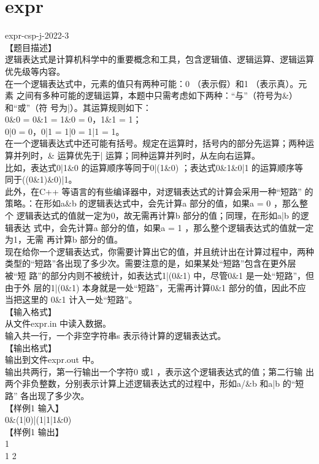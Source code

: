 \documentclass[12pt,twiside,a4paper]{ctexbook}
\numberwithin{chapter}{part}
\begin{document}
\section{expr}
expr-csp-j-2022-3\\
【题目描述】\\
逻辑表达式是计算机科学中的重要概念和工具，包含逻辑值、逻辑运算、逻辑运算
优先级等内容。\\
在一个逻辑表达式中，元素的值只有两种可能：0 （表示假）和1 （表示真）。元素
之间有多种可能的逻辑运算，本题中只需考虑如下两种：“与”（符号为\&）和“或”（符
号为|）。其运算规则如下：\\
0\&0 = 0\&1 = 1\&0 = 0，1\&1 = 1；\\
0|0 = 0，0|1 = 1|0 = 1|1 = 1。\\
在一个逻辑表达式中还可能有括号。规定在运算时，括号内的部分先运算；两种运
算并列时，\& 运算优先于| 运算；同种运算并列时，从左向右运算。\\
比如，表达式0|1\&0 的运算顺序等同于0|(1\&0) ；表达式0\&1\&0|1 的运算顺序等
同于((0\&1)\&0)|1。\\
此外，在C++ 等语言的有些编译器中，对逻辑表达式的计算会采用一种“短路”
的策略。：在形如a\&b 的逻辑表达式中，会先计算a 部分的值，如果a = 0 ，那么整个
逻辑表达式的值就一定为0，故无需再计算b 部分的值；同理，在形如a|b 的逻辑表达
式中，会先计算a 部分的值，如果a = 1 ，那么整个逻辑表达式的值就一定为1，无需
再计算b 部分的值。\\
现在给你一个逻辑表达式，你需要计算出它的值，并且统计出在计算过程中，两种
类型的“短路”各出现了多少次。需要注意的是，如果某处“短路”包含在更外层被“短
路”的部分内则不被统计，如表达式1|(0\&1) 中，尽管0\&1 是一处“短路”，但由于外
层的1|(0\&1) 本身就是一处“短路”，无需再计算0\&1 部分的值，因此不应当把这里的
0\&1 计入一处“短路”。\\
【输入格式】\\
从文件expr.in 中读入数据。\\
输入共一行，一个非空字符串s 表示待计算的逻辑表达式。\\
【输出格式】\\
输出到文件expr.out 中。\\
输出共两行，第一行输出一个字符0 或1 ，表示这个逻辑表达式的值；第二行输
出两个非负整数，分别表示计算上述逻辑表达式的过程中，形如a/\&b 和a|b 的“短路”
各出现了多少次。\\
【样例1 输入】\\
0\&(1|0)|(1|1|1\&0)\\
【样例1 输出】\\
1\\
1 2\\
\end{document}
